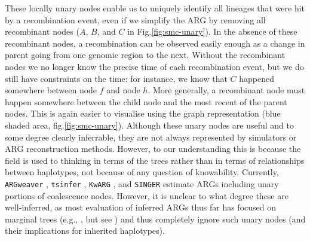 \documentclass{article}
\newcommand{\tsinfer}[0]{\texttt{tsinfer}}
\newcommand{\kwarg}[0]{\texttt{KwARG}}
\newcommand{\argweaver}[0]{\texttt{ARGweaver}}
\begin{document}

These locally unary nodes enable
us to uniquely identify all lineages that were hit by a recombination event,
even if we simplify the ARG by removing all recombinant nodes
($A$, $B$, and $C$ in Fig.\ref{fig:smc-unary}).
In the absence of these recombinant nodes, a recombination can be observed
easily enough as a change in parent going from one genomic region to the next.
Without the recombinant nodes we no longer know the precise time of each recombination event,
but we do still have constraints on the time:
for instance, we know that $C$ happened somewhere between node $f$ and node $h$.
More generally, a recombinant node must happen somewhere between the child node
and the most recent of the parent nodes.
This is again easier to visualise using the
graph representation (blue shaded area, fig.\ref{fig:smc-unary}).
Although these unary nodes are useful and to some degree clearly inferrable,
they are not always represented by simulators or ARG reconstruction methods.
However, to our understanding this is because
the field is used to thinking in terms of the trees
rather than in terms of relationships between haplotypes,
not because of any question of knowability.
Currently,
\argweaver{} \citep{rasmussen_genome-wide_2014},
\tsinfer{} \citep{kelleher_inferring_2019},
\kwarg{} \citep{ignatieva_kwarg_2021}, and
\texttt{SINGER} \citep{deng_robust_2024} estimate ARGs 
including unary portions of coalescence nodes.
However, it is unclear to what degree these are well-inferred,
as most evaluation of inferred ARGs thus far has focused on marginal trees
(e.g., \citet{brandt2022evaluation, kelleher_inferring_2019},
but see \citet{deng2021distribution})
and thus completely ignore such unary nodes
(and their implications for inherited haplotypes).
\end{document}
